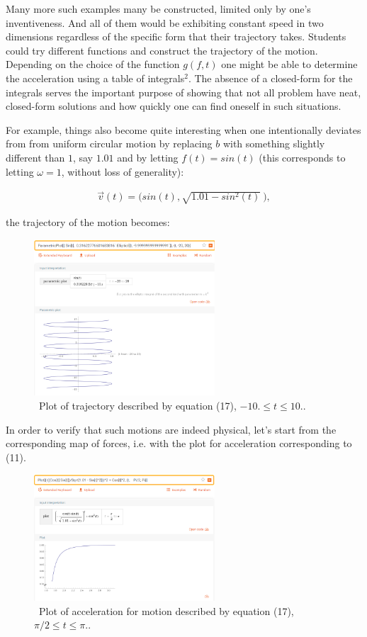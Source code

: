 \documentclass[journal]{IEEEtran}
\begin{document}
Many more such examples many be constructed, limited only by one's inventiveness.  And all of them would be exhibiting constant speed in two dimensions regardless of the specific form that their trajectory takes.  Students could try different functions and construct the trajectory of the motion.  Depending on the choice of the function $g(f,t)$ one might be able to determine the acceleration using a table of integrals$^2$.  The absence of a closed-form for the integrals serves the important purpose of showing that not all problem have neat, closed-form solutions and how quickly one can find oneself in such situations.  

\par For example, things also become quite interesting when one intentionally deviates from from uniform circular motion by replacing $b$ with something slightly different than $1$, say $1.01$ and by letting $f(t)= sin(t)$ (this corresponds to letting $\omega = 1$, without loss of generality):

\begin{align}
\vec{v}(t)=(sin(t), {\sqrt{1.01-sin^2(t)}\ )},
\end{align}

the trajectory of the motion becomes:

\begin{figure}[H]
\includegraphics[width=6.75cm]{FIG12.PNG}
\caption{\ Plot of trajectory described by equation (17), $ -10. \leq t \leq 10. $.\bigskip}
\centering
\end{figure} 

In order to verify that such motions are indeed physical, let's start from the corresponding map of forces, i.e. with the plot for acceleration corresponding to (11). 
\begin{figure}[H]
\includegraphics[width=6.75cm]{FIG13.PNG}
\caption{\ Plot of acceleration for motion described by equation (17), $ \pi/2 \leq t \leq \pi. $.\bigskip}
\centering
\end{figure}
\end{document}
